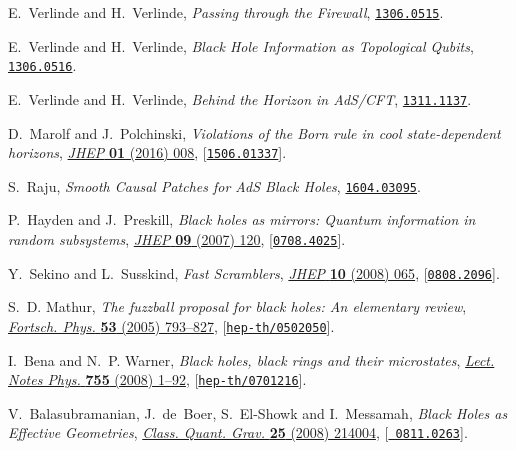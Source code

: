 \documentclass[10pt]{article}
\begin{document}
\begin{thebibliography}{100}
E.~Verlinde and H.~Verlinde, \emph{{Passing through the Firewall}},
  \href{http://arxiv.org/abs/1306.0515}{{\tt 1306.0515}}.

E.~Verlinde and H.~Verlinde, \emph{{Black Hole Information as Topological
  Qubits}},  \href{http://arxiv.org/abs/1306.0516}{{\tt 1306.0516}}.

E.~Verlinde and H.~Verlinde, \emph{{Behind the Horizon in AdS/CFT}},
  \href{http://arxiv.org/abs/1311.1137}{{\tt 1311.1137}}.

D.~Marolf and J.~Polchinski, \emph{{Violations of the Born rule in cool
  state-dependent horizons}},
  \href{http://dx.doi.org/10.1007/JHEP01(2016)008}{\emph{JHEP} {\bf 01} (2016)
  008}, [\href{http://arxiv.org/abs/1506.01337}{{\tt 1506.01337}}].

S.~Raju, \emph{{Smooth Causal Patches for AdS Black Holes}},
  \href{http://arxiv.org/abs/1604.03095}{{\tt 1604.03095}}.

P.~Hayden and J.~Preskill, \emph{{Black holes as mirrors: Quantum information
  in random subsystems}},
  \href{http://dx.doi.org/10.1088/1126-6708/2007/09/120}{\emph{JHEP} {\bf 09}
  (2007) 120}, [\href{http://arxiv.org/abs/0708.4025}{{\tt 0708.4025}}].

Y.~Sekino and L.~Susskind, \emph{{Fast Scramblers}},
  \href{http://dx.doi.org/10.1088/1126-6708/2008/10/065}{\emph{JHEP} {\bf 10}
  (2008) 065}, [\href{http://arxiv.org/abs/0808.2096}{{\tt 0808.2096}}].

S.~D. Mathur, \emph{{The fuzzball proposal for black holes: An elementary
  review}}, \href{http://dx.doi.org/10.1002/prop.200410203}{\emph{Fortsch.
  Phys.} {\bf 53} (2005) 793--827},
  [\href{http://arxiv.org/abs/hep-th/0502050}{{\tt hep-th/0502050}}].

I.~Bena and N.~P. Warner, \emph{{Black holes, black rings and their
  microstates}}, \href{http://dx.doi.org/10.1007/978-3-540-79523-0}{\emph{Lect.
  Notes Phys.} {\bf 755} (2008) 1--92},
  [\href{http://arxiv.org/abs/hep-th/0701216}{{\tt hep-th/0701216}}].

V.~Balasubramanian, J.~de~Boer, S.~El-Showk and I.~Messamah, \emph{{Black Holes
  as Effective Geometries}},
  \href{http://dx.doi.org/10.1088/0264-9381/25/21/214004}{\emph{Class. Quant.
  Grav.} {\bf 25} (2008) 214004}, [\href{http://arxiv.org/abs/0811.0263}{{\tt
  0811.0263}}].


\end{thebibliography}
\end{document}
